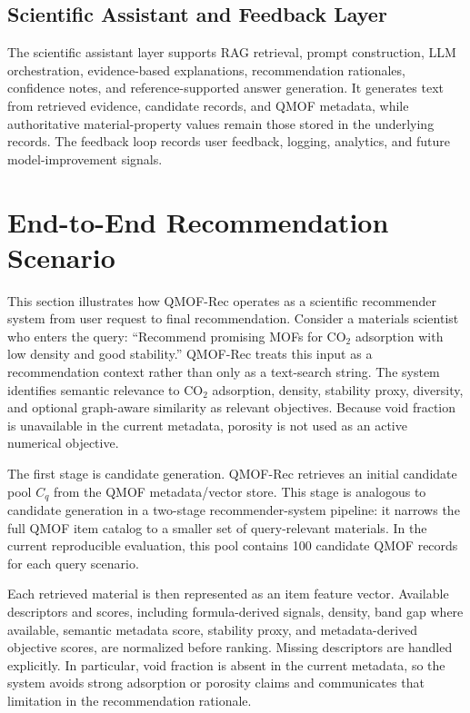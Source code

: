 \documentclass[12pt,a4paper]{article}
\begin{document}
\subsection{Scientific Assistant and Feedback Layer}

The scientific assistant layer supports RAG retrieval, prompt construction, LLM orchestration, evidence-based explanations, recommendation rationales, confidence notes, and reference-supported answer generation. It generates text from retrieved evidence, candidate records, and QMOF metadata, while authoritative material-property values remain those stored in the underlying records. The feedback loop records user feedback, logging, analytics, and future model-improvement signals.

\section{End-to-End Recommendation Scenario}
\label{sec:scenario}

This section illustrates how QMOF-Rec operates as a scientific recommender system from user request to final recommendation. Consider a materials scientist who enters the query: ``Recommend promising MOFs for CO$_2$ adsorption with low density and good stability.'' QMOF-Rec treats this input as a recommendation context rather than only as a text-search string. The system identifies semantic relevance to CO$_2$ adsorption, density, stability proxy, diversity, and optional graph-aware similarity as relevant objectives. Because void fraction is unavailable in the current metadata, porosity is not used as an active numerical objective.

The first stage is candidate generation. QMOF-Rec retrieves an initial candidate pool $C_q$ from the QMOF metadata/vector store. This stage is analogous to candidate generation in a two-stage recommender-system pipeline: it narrows the full QMOF item catalog to a smaller set of query-relevant materials. In the current reproducible evaluation, this pool contains 100 candidate QMOF records for each query scenario.

Each retrieved material is then represented as an item feature vector. Available descriptors and scores, including formula-derived signals, density, band gap where available, semantic metadata score, stability proxy, and metadata-derived objective scores, are normalized before ranking. Missing descriptors are handled explicitly. In particular, void fraction is absent in the current metadata, so the system avoids strong adsorption or porosity claims and communicates that limitation in the recommendation rationale.
\end{document}
